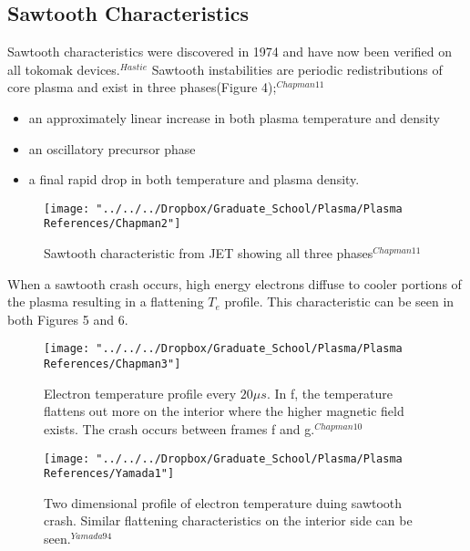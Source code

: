 \documentclass{article}
\begin{document}
\subsection{Sawtooth Characteristics}
Sawtooth characteristics were discovered in 1974 and have now been verified on all tokomak devices.$^{Hastie}$  Sawtooth instabilities are periodic redistributions of core plasma and exist in three phases(Figure 4);$^{Chapman11}$
\begin{itemize}
\item an approximately linear increase in both plasma temperature and density
\item an oscillatory precursor phase
\item a final rapid drop in both temperature and plasma density.
\end{itemize}
\begin{figure}[h]
\centering
\texttt{[image: "../../../Dropbox/Graduate\_School/Plasma/Plasma References/Chapman2"]}
\caption{Sawtooth characteristic from JET showing all three phases$^{Chapman11}$}
\label{fig:Chapman2}
\end{figure}
When a sawtooth crash occurs, high energy electrons diffuse to cooler portions of the plasma resulting in a flattening $T_e$ profile.  This characteristic can be seen in both Figures 5 and 6.
\begin{figure}[h]
\centering
\texttt{[image: "../../../Dropbox/Graduate\_School/Plasma/Plasma References/Chapman3"]}
\caption{Electron temperature profile every $20\mu s$. In f, the temperature flattens out more on the interior where the higher magnetic field exists. The crash occurs between frames f and g.$^{Chapman10}$}
\label{fig:Chapman3}
\end{figure}
\begin{figure}[h]
\centering
\texttt{[image: "../../../Dropbox/Graduate\_School/Plasma/Plasma References/Yamada1"]}
\caption{Two dimensional profile of electron temperature duing sawtooth crash. Similar flattening characteristics on the interior side can be seen.$^{Yamada94}$}
\label{fig:Yamada1}
\end{figure}
\end{document}
